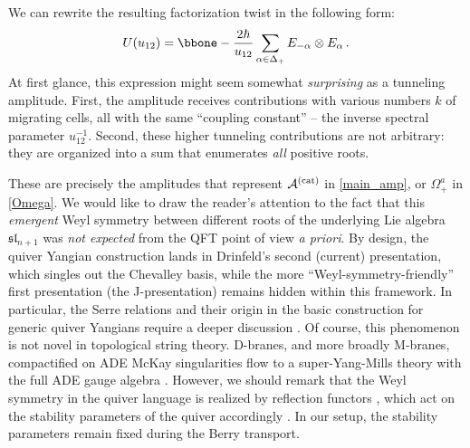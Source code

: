 \documentclass[10pt]{article}
\theoremstyle{definition}
\def\CA{{\cal A}}
\def\fl{\mathfrak{l}}
\def\fs{\mathfrak{s}}
\def\fs{\mathfrak{s}}
\def\lm{\limits}
\numberwithin{equation}{section}
\begin{document}
We can rewrite the resulting factorization twist in the following form:
\begin{equation}
	U(u_{12})=\bbone-\frac{2\hbar}{u_{12}}\sum\lm_{\alpha\in\Delta_+}E_{-\alpha}\otimes E_{\alpha}\,.
\end{equation}
At first glance, this expression might seem somewhat \emph{surprising} as a tunneling amplitude.
First, the amplitude receives contributions with various numbers $k$ of migrating cells, all with the same ``coupling constant'' -- the inverse spectral parameter $u_{12}^{-1}$.
Second, these higher tunneling contributions are not arbitrary: they are organized into a sum that enumerates \emph{all} positive roots.

These are precisely the amplitudes that represent $\CA^{\mathrm{(cat)}}$ in \eqref{main_amp}, or $\Omega_+^a$ in \eqref{Omega}.
We would like to draw the reader's attention to the fact that this \emph{emergent} Weyl symmetry between different roots of the underlying Lie algebra $\fs\fl_{n+1}$ was \emph{not expected} from the QFT point of view \emph{a priori}.
By design, the quiver Yangian construction lands in Drinfeld's second (current) presentation, which singles out the Chevalley basis, while the more ``Weyl-symmetry-friendly'' first presentation (the J-presentation) remains hidden within this framework.
In particular, the Serre relations and their origin in the basic construction for generic quiver Yangians require a deeper discussion \cite{Li:2020rij,Negut:2022pka}.
Of course, this phenomenon is not novel in topological string theory.
D-branes, and more broadly M-branes, compactified on ADE McKay singularities \cite{McKay:1980} flow to a super-Yang-Mills theory with the full ADE gauge algebra \cite{Douglas:1996sw,Aspinwall:2004jr,Witten:1996Phase}.
However, we should remark that the Weyl symmetry in the quiver language is realized by reflection functors \cite{Bernstein:1973Coxeter,Nakajima:2003Reflection,Maffei:2005Quiver}, which act on the stability parameters of the quiver accordingly \cite{Lusztig:1976Finiteness,Galakhov:2026cwv}.
In our setup, the stability parameters remain fixed during the Berry transport.
 
\end{document}
